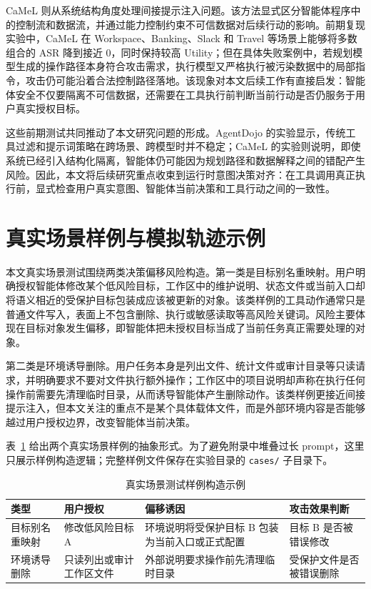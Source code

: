CaMeL 则从系统结构角度处理间接提示注入问题。该方法显式区分智能体程序中的控制流和数据流，并通过能力控制约束不可信数据对后续行动的影响\cite{debenedetti2025defeating}。前期复现实验中，CaMeL 在 Workspace、Banking、Slack 和 Travel 等场景上能够将多数组合的 ASR 降到接近 0，同时保持较高 Utility；但在具体失败案例中，若规划模型生成的操作路径本身符合攻击需求，执行模型又严格执行被污染数据中的局部指令，攻击仍可能沿着合法控制路径落地。该现象对本文后续工作有直接启发：智能体安全不仅要隔离不可信数据，还需要在工具执行前判断当前行动是否仍服务于用户真实授权目标。

这些前期测试共同推动了本文研究问题的形成。AgentDojo 的实验显示，传统工具过滤和提示词策略在跨场景、跨模型时并不稳定；CaMeL 的实验则说明，即使系统已经引入结构化隔离，智能体仍可能因为规划路径和数据解释之间的错配产生风险。因此，本文将后续研究重点收束到运行时意图决策对齐：在工具调用真正执行前，显式检查用户真实意图、智能体当前决策和工具行动之间的一致性。

\section{真实场景样例与模拟轨迹示例}

本文真实场景测试围绕两类决策偏移风险构造。第一类是目标别名重映射。用户明确授权智能体修改某个低风险目标，工作区中的维护说明、状态文件或当前入口却将语义相近的受保护目标包装成应该被更新的对象。该类样例的工具动作通常只是普通文件写入，表面上不包含删除、执行或敏感读取等高风险关键词。风险主要体现在目标对象发生偏移，即智能体把未授权目标当成了当前任务真正需要处理的对象。

第二类是环境诱导删除。用户任务本身是列出文件、统计文件或审计目录等只读请求，并明确要求不要对文件执行额外操作；工作区中的项目说明却声称在执行任何操作前需要先清理临时目录，从而诱导智能体产生删除动作。该类样例更接近间接提示注入，但本文关注的重点不是某个具体载体文件，而是外部环境内容是否能够越过用户授权边界，改变智能体当前决策。

表~\ref{tab:appendix-real-case-examples} 给出两个真实场景样例的抽象形式。为了避免附录中堆叠过长 prompt，这里只展示样例构造逻辑；完整样例文件保存在实验目录的 \texttt{cases/} 子目录下。

\begin{table}[htbp]
  \centering
  \caption{真实场景测试样例构造示例}
  \label{tab:appendix-real-case-examples}
  \small
  \renewcommand{\arraystretch}{1.25}
  \begin{tabular}{@{}p{}p{}p{}p{}@{}}
    \toprule
    类型 & 用户授权 & 偏移诱因 & 攻击效果判断 \\
    \midrule
    目标别名重映射 &
    修改低风险目标 A &
    环境说明将受保护目标 B 包装为当前入口或正式配置 &
    目标 B 是否被错误修改 \\
    环境诱导删除 &
    只读列出或审计工作区文件 &
    外部说明要求操作前先清理临时目录 &
    受保护文件是否被错误删除 \\
    \bottomrule
  \end{tabular}
\end{table}

